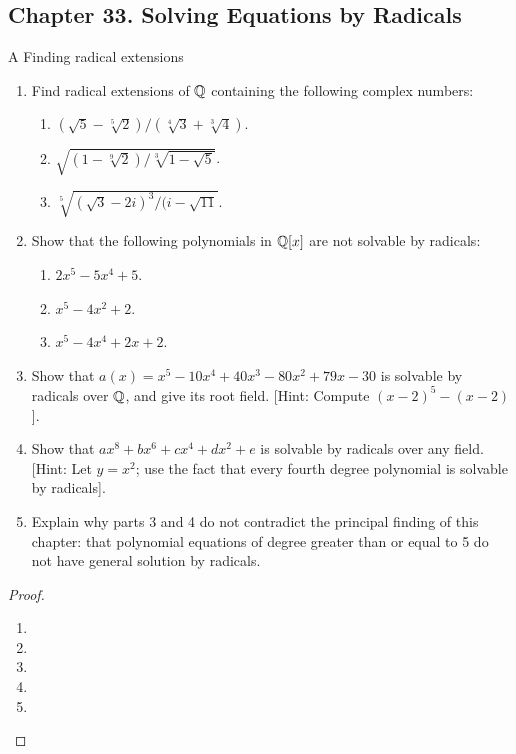 \subsection*{Chapter 33. Solving Equations by Radicals}


\begin{exercise}{A Finding radical extensions}
\begin{enumerate}
    \item Find radical extensions of $\mathbb{Q}$ containing the following complex numbers:
    \begin{enumerate}
        \item $(\sqrt{5}-\sqrt[5]{2})/(\sqrt[4]{3}+\sqrt[3]{4})$.
        \item $\sqrt{(1-\sqrt[9]{2})/\sqrt[3]{1-\sqrt{5}}}$.
        \item $\sqrt[5]{(\sqrt{3}-2i)^3/(i-\sqrt{11}}$.
    \end{enumerate}
    \item Show that the following polynomials in $\mathbb{Q}[x]$ are not solvable by radicals:
    \begin{enumerate}
        \item $2x^5-5x^4+5$.
        \item $x^5-4x^2+2$.
        \item $x^5-4x^4+2x+2$.
    \end{enumerate}
    \item Show that $a(x)=x^5-10x^4+40x^3-80x^2+79x-30$ is solvable by radicals over $\mathbb{Q}$, and give its root field. [Hint: Compute $(x-2)^5-(x-2)$].
    \item Show that $ax^8+bx^6+cx^4+dx^2+e$ is solvable by radicals over any field. [Hint: Let $y=x^2$; use the fact that every fourth degree polynomial is solvable by radicals].
    \item Explain why parts 3 and 4 do not contradict the principal finding of this chapter: that polynomial equations of degree greater than or equal to 5 do not have general solution by radicals.
\end{enumerate}
\end{exercise}
\begin{proof}
 \begin{enumerate}
     \item 
     \item
     \item
     \item
    \item
 \end{enumerate}
\end{proof}

